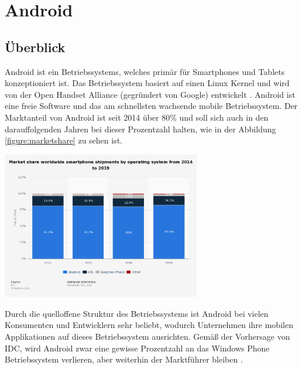\chapter{Android}
\label{sec:android}

\section{Überblick}
Android ist ein Betriebssystems, welches primär für Smartphones und Tablets konzeptioniert ist. Das Betriebssystem basiert auf einen Linux Kernel und wird von der Open Handset Alliance (gegründert von Google) entwickelt \cite{overviewAndroid:singh}. Android ist eine freie Software und das am schnellsten wachsende mobile Betriebssystem. Der Marktanteil von Android ist seit 2014 über 80\% und soll sich auch in den darauffolgenden Jahren bei dieser Prozentzahl halten, wie in der Abbildung \ref{figure:marketshare} zu sehen ist. \\
 
\begin{minipage}{\textwidth} 
	\centering	
	\includegraphics[width=0.65\textwidth]{figures/smartphone-os-market-share.png}
	\label{figure:marketshare}
	\vspace{2ex}
\end{minipage}

Durch die quelloffene Struktur des Betriebssystems ist Android bei vielen Konsumenten und Entwicklern sehr beliebt, wodurch Unternehmen ihre mobilen Applikationen auf dieses Betriebssystem ausrichten. Gemäß der Vorhersage von IDC, wird Android zwar eine gewisse Prozentzahl an das Windows Phone Betriebssystem verlieren, aber weiterhin der Marktführer bleiben \cite{statsticMobileOS}.

